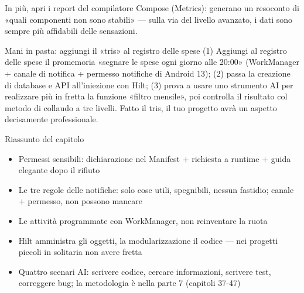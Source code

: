 In più, apri i report del compilatore Compose (Metrics): generano un resoconto di «quali componenti non sono stabili» — sulla via del livello avanzato, i dati sono sempre più affidabili delle sensazioni.

\begin{tcbpractice}{Mani in pasta: aggiungi il «tris» al registro delle spese}
(1) Aggiungi al registro delle spese il promemoria «segnare le spese ogni giorno alle 20:00» (WorkManager + canale di notifica + permesso notifiche di Android 13); (2) passa la creazione di database e API all'iniezione con Hilt; (3) prova a usare uno strumento AI per realizzare più in fretta la funzione «filtro mensile», poi controlla il risultato col metodo di collaudo a tre livelli. Fatto il tris, il tuo progetto avrà un aspetto decisamente professionale.

\end{tcbpractice}

\begin{tcbsummary}{Riassunto del capitolo}
\begin{itemize}
  \item Permessi sensibili: dichiarazione nel Manifest + richiesta a runtime + guida elegante dopo il rifiuto
  \item Le tre regole delle notifiche: solo cose utili, spegnibili, nessun fastidio; canale + permesso, non possono mancare
  \item Le attività programmate con WorkManager, non reinventare la ruota
  \item Hilt amministra gli oggetti, la modularizzazione il codice — nei progetti piccoli in solitaria non avere fretta
  \item Quattro scenari AI: scrivere codice, cercare informazioni, scrivere test, correggere bug; la metodologia è nella parte 7 (capitoli 37-47)
\end{itemize}

\end{tcbsummary}
